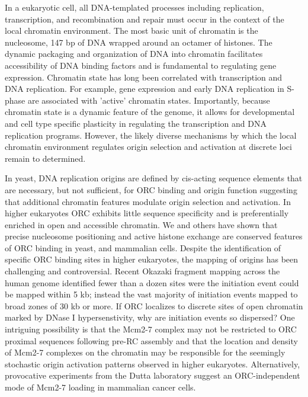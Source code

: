 In a eukaryotic cell, all DNA-templated processes including replication, transcription, and recombination and repair must occur in the context of the local chromatin environment.  The most basic unit of chromatin is the nucleosome, 147 bp of DNA wrapped around an octamer of histones\citep{McGinty2015-kd}.  The dynamic packaging and organization of DNA into chromatin facilitates accessibility of DNA binding factors and is fundamental to regulating gene expression\citep{Kouzarides2007-sk}. Chromatin state has long been correlated with transcription and DNA replication\citep{Stambrook1970-jm,Goldman1984-im}.  For example, gene expression and early DNA replication in S-phase are associated with 'active' chromatin states\citep{Rhind2013-yr}. Importantly, because chromatin state is a dynamic feature of the genome, it allows for developmental and cell type specific plasticity in regulating the transcription and DNA replication programs\citep{Goren2008-wr}.  However, the likely diverse mechanisms by which the local chromatin environment regulates origin selection and activation at discrete loci remain to determined.

In yeast, DNA replication origins are defined by cis-acting sequence elements that are necessary, but not sufficient, for ORC binding and origin function\citep{Breier2004-tw} suggesting that additional chromatin features modulate origin selection and activation.  In higher eukaryotes ORC exhibits little sequence specificity\citep{Vashee2003-xr} and is preferentially enriched in open and accessible chromatin\citep{MacAlpine2010-ju,Miotto2016-jt}.   We and others have shown that precise nucleosome positioning and active histone exchange are conserved features of ORC binding in yeast\citep{Eaton2010-fq,Berbenetz2010-hh}, \dros\citep{Liu2015-nr,MacAlpine2010-wz} and mammalian cells\citep{Lombrana2013-aw,Lubelsky2011-dj}.  Despite the identification of specific ORC binding sites in higher eukaryotes\citep{Miotto2016-jt}, the mapping of origins has been challenging and controversial\citep{Prioleau2016-bj}.  Recent Okazaki fragment mapping across the human genome identified fewer than a dozen sites were the initiation event could be mapped within 5 kb; instead the vast majority of initiation events mapped to broad zones of 30 kb or more\citep{Petryk2016-rr}.  If ORC localizes to discrete sites of open chromatin marked by DNase I hypersenstivity\citep{MacAlpine2010-ju,Miotto2016-jt}, why are initiation events so dispersed?  One intriguing possibility is that the Mcm2-7 complex may not be restricted to ORC proximal sequences following pre-RC assembly and that the location and density of Mcm2-7 complexes on the chromatin may be responsible for the seemingly stochastic origin activation patterns observed in higher eukaryotes. Alternatively, provocative experiments from the Dutta laboratory  suggest an ORC-independent mode of Mcm2-7 loading in mammalian cancer cells\citep{Shibata2016-uc}. 


